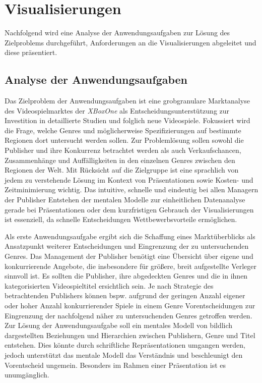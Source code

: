 \documentclass[usegeometry=true]{scrartcl}
\begin{document}
\section{Visualisierungen}
Nachfolgend wird eine Analyse der Anwendungsaufgaben zur Lösung des Zielproblems durchgeführt, Anforderungen an die Visualisierungen abgeleitet und diese präsentiert.

\subsection{Analyse der Anwendungsaufgaben}
Das Zielproblem der Anwendungsaufgaben ist eine grobgranulare Marktanalyse des Videospielmarktes der \textit{XBoxOne} 
als Entscheidungsunterstützung zur Investition in detaillierte Studien und folglich neue Videospiele. 
Fokussiert wird die Frage, welche Genres und möglicherweise Spezifizierungen auf bestimmte Regionen dort untersucht werden sollen. 
Zur Problemlösung sollen sowohl die Publisher und ihre Konkurrenz betrachtet werden als auch Verkaufschancen, Zusammenhänge und Auffälligkeiten in den einzelnen Genres zwischen den Regionen der Welt. 
Mit Rücksicht auf die Zielgruppe ist eine sprachlich von jedem zu verstehende Lösung im Kontext von Präsentationen sowie Kosten- und Zeitminimierung wichtig. 
Das intuitive, schnelle und eindeutig bei allen Managern der Publisher Entstehen der mentalen Modelle zur 
einheitlichen Datenanalyse gerade bei Präsentationen oder dem kurzfristigen Gebrauch der Visualisierungen ist essenziell, 
da schnelle Entscheidungen Wettbewerbsvorteile ermöglichen.

Als erste Anwendungsaufgabe ergibt sich die Schaffung eines Marktüberblicks als Ansatzpunkt weiterer Entscheidungen und Eingrenzung der zu untersuchenden Genres. 
Das Management der Publisher benötigt eine Übersicht über eigene und konkurrierende Angebote, die insbesondere für größere, breit aufgestellte Verleger sinnvoll ist.
Es sollten die Publisher, ihre abgedeckten Genres und die in ihnen kategorisierten Videospieltitel ersichtlich sein. 
Je nach Strategie des betrachtenden Publishers können bspw. aufgrund der geringen Anzahl eigener oder hoher Anzahl konkurrierender Spiele in einem Genre 
Vorentscheidungen zur Eingrenzung der nachfolgend näher zu untersuchenden Genres getroffen werden. 
Zur Lösung der Anwendungsaufgabe soll ein mentales Modell von bildlich dargestellten Beziehungen und Hierarchien zwischen Publishern, Genre und Titel entstehen.
Dies könnte durch schriftliche Repräsentationen umgangen werden, jedoch unterstützt das mentale Modell das Verständnis und beschleunigt den Vorentscheid ungemein. 
Besonders im Rahmen einer Präsentation ist es unumgänglich.
\end{document}
